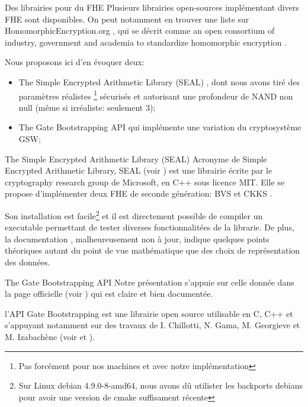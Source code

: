 \begin{section}{Des librairies pour du FHE}
Plusieurs librairies open-sources implémentant divers FHE sont disponibles. 
On peut notamment en trouver une liste sur HomomorphicEncryption.org \cite{homencrypt.org}, 
qui se décrit comme \og an open consortium of industry, government and academia to 
standardize homomorphic encryption \fg.

Nous proposons ici d'en évoquer deux:
\begin{itemize}
\item The Simple Encrypted Arithmetic Library (SEAL) \cite{seal}, dont nous avons tiré des paramètres  
\og réalistes \fg\footnote{Pas forcément pour nos machines et avec notre implémentation}
sécurisés et autorisant une profondeur de NAND non null (même si irréaliste: seulement 3);
\item The Gate Bootstrapping API \cite{TFHE} qui implémente une variation du cryptosystème GSW;
\end{itemize}

\begin{subsection}{The Simple Encrypted Arithmetic Library (SEAL)}
Acronyme de Simple Encrypted Arithmetic Library, SEAL (voir \cite{seal}) 
est une librairie écrite par le \og cryptography research group \fg de Microsoft, en C++ sous 
licence MIT. Elle se propose d'implémenter deux FHE de seconde génération: 
BVS \cite{EPRINT:FanVer12} et CKKS \cite{AC:CKKS17}.

Son installation est facile\footnote{Sur Linux debian 4.9.0-8-amd64, nous avons dû
utilister les backports debians pour avoir une version de cmake suffisament récente}
et il est directement possible de compiler un executable permettant de tester 
diverses fonctionnalitées de la librarie. De plus, la documentation
\cite{seal_manual_231},
malheureusement non à jour, indique quelques points théoriques autant du point 
de vue mathématique que des choix de représentation des données.
\end{subsection}

\begin{subsection}{The Gate Bootstrapping API}
Notre présentation s'appuie sur celle donnée dans la page officielle (voir \cite{TFHE})
 qui est claire et bien documentée.

l'API Gate Bootstrapping est une librairie open source utilisable en C, C++ et 
s'appuyant notamment sur des travaux de I. Chillotti, N. Gama, M. Georgieve et M. Izabachène 
(voir \cite{cryptoeprint:2017:430} et  \cite{cryptoeprint:2016:870}). 


\end{subsection}
\end{section}
